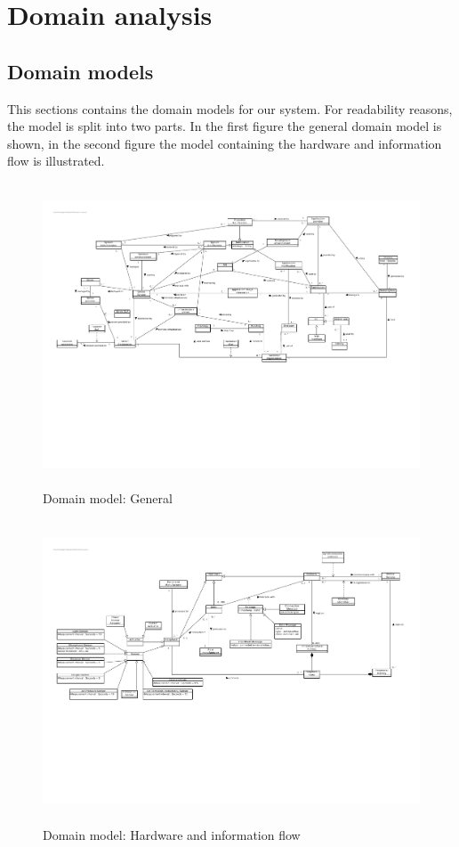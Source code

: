 \documentclass[english]{sareport}
\begin{document}
\maketitle

\tableofcontents

\chapter{Domain analysis}\label{sec:domain}
\section{Domain models}
This sections contains the domain models for our system. For readability reasons, the model is split into two parts. In the first figure the general domain model is shown, in the second figure the model containing the hardware and information flow is illustrated.

\begin{figure}[H]
    \centering
    \includegraphics[width=\textwidth, height=9cm, angle=90]{Domain_model.pdf}
    \caption{Domain model: General}\label{fig:domain_model1}
\end{figure}

\begin{figure}[H]
    \centering
    \includegraphics[width=\textwidth, height=9cm, angle=90]{Hardware_and_information_flow.pdf}
    \caption{Domain model: Hardware and information flow}\label{fig:domain_model2}
\end{figure}
\end{document}
